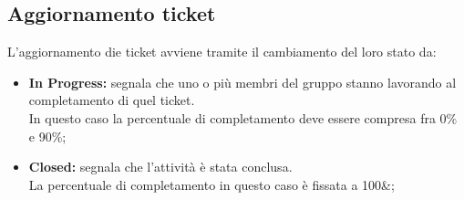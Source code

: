   \subsection{Aggiornamento ticket}
    L'aggiornamento die ticket avviene tramite il cambiamento del loro stato da:
    \begin{itemize}
      \item \textbf{In Progress: }segnala che uno o più membri del gruppo stanno lavorando al completamento di quel ticket.\\
      In questo caso la percentuale di completamento deve essere compresa fra 0\% e 90\%;
      \item \textbf{Closed: }segnala che l'attività è stata conclusa.\\
      La percentuale di completamento in questo caso è fissata a 100\&;
    \end{itemize}
